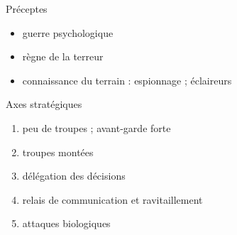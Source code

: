 \documentclass{article}
\begin{document}
Préceptes
\begin{itemize}
\item guerre psychologique
\item règne de la terreur
\item connaissance du terrain : espionnage ; éclaireurs
\end{itemize}
Axes stratégiques
\begin{enumerate}
\item peu de troupes ; avant-garde forte
\item troupes montées %
\item délégation des décisions
\item relais de communication et ravitaillement
\item attaques biologiques
\end{enumerate}
\cite{khan_wiki, military_strategy, mongol_army}
\end{document}
